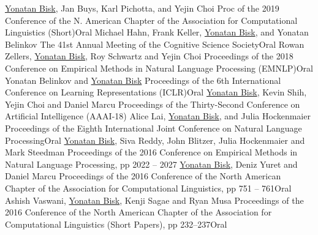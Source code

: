 \documentclass[10pt,letter]{moderncv}
\newcommand{\YB}{\underline{Yonatan Bisk}}
\begin{document}
\pub{--}
  {\href{https://www.aclweb.org/anthology/N19-1412}{\color{linkcolor}{Benchmarking Hierarchical Script Knowledge}}}
  {\YB{}, Jan Buys, Karl Pichotta, and Yejin Choi}
  {Proc of the 2019 Conference of the N. American Chapter of the Association for Computational Linguistics (Short)}{Oral}{}
\pub{--}
  {\href{https://arxiv.org/abs/1902.00595}{\color{linkcolor}{Character-based Surprisal as a Model of Human Reading in the Presence of Errors}}}
  {Michael Hahn, Frank Keller, \YB{}, and Yonatan Belinkov}
  {The 41st Annual Meeting of the Cognitive Science Society}{Oral}{}
  {\href{http://rowanzellers.com/swag/}{\color{linkcolor}{SWAG: A Large-Scale Adversarial Dataset for Grounded Commonsense Inference}}}
  {Rowan Zellers, \YB{}, Roy Schwartz and Yejin Choi}
  {Proceedings of the 2018 Conference on Empirical Methods in Natural Language Processing (EMNLP)}{Oral}{}
\pub{--}
  {\href{https://arxiv.org/abs/1711.02173}{\color{linkcolor}{Synthetic and Natural Noise Both Break Neural Machine Translation}}}
  {Yonatan Belinkov and \YB{}}
  {Proceedings of the 6th International Conference on Learning Representations (ICLR)}{Oral}{}
\pub{--}
  {\href{http://yonatanbisk.com/papers/2018-AAAI.pdf}{\color{linkcolor}{Learning Interpretable Spatial Operations in a Rich 3D Blocks World}}}
  {\YB{}, Kevin Shih, Yejin Choi and Daniel Marcu}
  {Proceedings of the Thirty-Second Conference on Artificial Intelligence (AAAI-18) }{}{}
  {\href{https://arxiv.org/abs/1710.02925}{\color{linkcolor}{Natural Language Inference from Multiple Premises}}}
  {Alice Lai, \YB{}, and Julia Hockenmaier}
  {Proceedings of the Eighth International Joint Conference on Natural Language Processing}{Oral}{}
  {\href{http://yonatanbisk.com/papers/2016-EMNLP.pdf}{\color{linkcolor}{Evaluating Induced CCG Parsers on Grounded Semantic Parsing}}}
{\YB{}, Siva Reddy, John Blitzer, Julia Hockenmaier and Mark Steedman}
  {Proceedings of the 2016 Conference on Empirical Methods in Natural Language Processing, pp 2022 -- 2027}{}{}
\pub{--}
  {\href{http://yonatanbisk.com/papers/2016-NAACL.pdf}{\color{linkcolor}{Natural Language Communication with Robots}}}
  {\YB{}, Deniz Yuret and Daniel Marcu}
  {Proceedings of the 2016 Conference of the North American Chapter of the Association for Computational Linguistics, pp 751 -- 761}{Oral}{}
\pub{--}
  {\href{http://yonatanbisk.com/papers/2016-NAACLShort.pdf}{\color{linkcolor}{Supertagging With LSTMs}}}
  {Ashish Vaswani, \YB, Kenji Sagae and Ryan Musa}
  {Proceedings of the 2016 Conference of the North American Chapter of the Association for Computational Linguistics (Short Papers), pp 232--237}{Oral}{}
\end{document}
